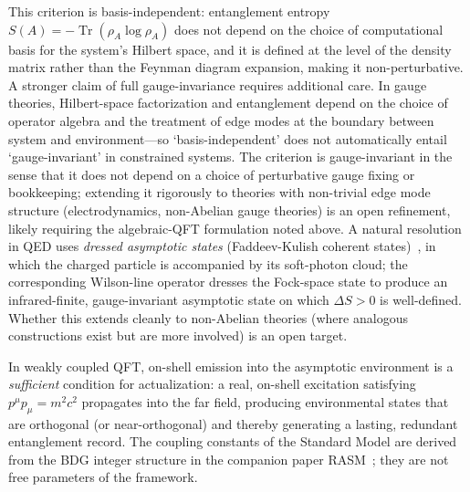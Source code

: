 \documentclass[11pt,a4paper]{article}
\theoremstyle{plain}
\theoremstyle{definition}
\theoremstyle{remark}
\begin{document}
This criterion is basis-independent: entanglement entropy $S(A) = -\operatorname{Tr}(\rho_A
\log \rho_A)$ does not depend on the choice of computational basis for the
system's Hilbert space, and it is defined at the level of the density matrix
rather than the Feynman diagram expansion, making it non-perturbative. A stronger
claim of full gauge-invariance requires additional care. In gauge theories,
Hilbert-space factorization and entanglement depend on the choice of operator
algebra and the treatment of edge modes at the boundary between system and
environment---so `basis-independent' does not automatically entail `gauge-invariant'
in constrained systems. The criterion is gauge-invariant in the sense that it does
not depend on a choice of perturbative gauge fixing or bookkeeping; extending it
rigorously to theories with non-trivial edge mode structure (electrodynamics,
non-Abelian gauge theories) is an open refinement, likely requiring the
algebraic-QFT formulation noted above.
A natural resolution in QED uses \emph{dressed asymptotic states}
(Faddeev-Kulish coherent states)~\citep{Kulish1970}, in which the
charged particle is accompanied by its soft-photon cloud; the
corresponding Wilson-line operator dresses the Fock-space state to produce
an infrared-finite, gauge-invariant asymptotic state on which $\Delta S > 0$
is well-defined. Whether this extends cleanly to non-Abelian theories
(where analogous constructions exist but are more involved) is an open target.

In weakly coupled QFT, on-shell emission into the asymptotic environment is a
\emph{sufficient} condition for actualization: a real, on-shell excitation
satisfying $p^{\mu}p_{\mu} = m^{2}c^{2}$ propagates into the far field, producing
environmental states that are orthogonal (or near-orthogonal) and thereby
generating a lasting, redundant entanglement record.
The coupling constants of the Standard Model are derived from the BDG
integer structure in the companion paper RASM~\cite{Sandeman2026RASM};
they are not free parameters of the framework.
\end{document}
